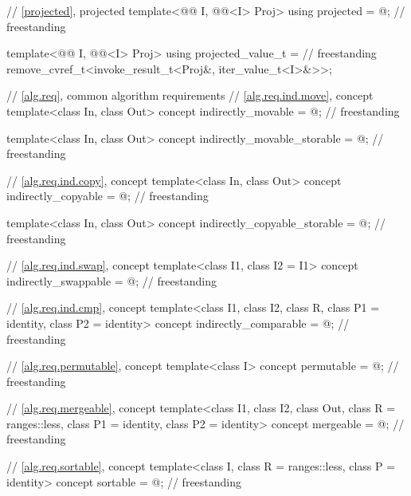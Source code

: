 \begin{codeblock}
{  // \ref{projected}, projected
  template<@@ I, @@<I> Proj>
    using projected = @\seebelow@;                                                    // freestanding

  template<@@ I, @@<I> Proj>
  using projected_value_t =                                                         // freestanding
    remove_cvref_t<invoke_result_t<Proj&, iter_value_t<I>&>>;

  // \ref{alg.req}, common algorithm requirements
  // \ref{alg.req.ind.move}, concept 
  template<class In, class Out>
    concept indirectly_movable = @\seebelow@;                                         // freestanding

  template<class In, class Out>
    concept indirectly_movable_storable = @\seebelow@;                                // freestanding

  // \ref{alg.req.ind.copy}, concept 
  template<class In, class Out>
    concept indirectly_copyable = @\seebelow@;                                        // freestanding

  template<class In, class Out>
    concept indirectly_copyable_storable = @\seebelow@;                               // freestanding

  // \ref{alg.req.ind.swap}, concept 
  template<class I1, class I2 = I1>
    concept indirectly_swappable = @\seebelow@;                                       // freestanding

  // \ref{alg.req.ind.cmp}, concept 
  template<class I1, class I2, class R, class P1 = identity, class P2 = identity>
    concept indirectly_comparable = @\seebelow@;                                      // freestanding

  // \ref{alg.req.permutable}, concept 
  template<class I>
    concept permutable = @\seebelow@;                                                 // freestanding

  // \ref{alg.req.mergeable}, concept 
  template<class I1, class I2, class Out,
           class R = ranges::less, class P1 = identity, class P2 = identity>
    concept mergeable = @\seebelow@;                                                  // freestanding

  // \ref{alg.req.sortable}, concept 
  template<class I, class R = ranges::less, class P = identity>
    concept sortable = @\seebelow@;                                                   // freestanding

}
\end{codeblock}
